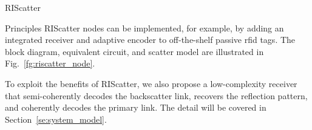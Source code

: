 \documentclass[journal]{IEEEtran}
\begin{document}
\begin{section}{RIScatter}
\begin{subsection}{Principles}
		RIScatter nodes can be implemented, for example, by adding an integrated receiver \cite{Kim2021a} and adaptive encoder \cite{He2020e} to off-the-shelf passive \gls{rfid} tags.
		The block diagram, equivalent circuit, and scatter model are illustrated in Fig.~\ref{fg:riscatter_node}.
		\begin{figure*}[!t]
			\centering
			\caption{
			Block diagram, equivalent circuit, and scatter model of a RIScatter node.
			The solid and dashed vectors represent signal and energy flows.
			The scatter antenna behaves as a constant power source, where the voltage $V_0$ and current $I_0$ are introduced by incident electric field $\vec{E}_{\text{I}}$ and magnetic field $\vec{H}_{\text{I}}$ \cite{Huang2021}.
			}
			\label{fg:riscatter_node}
		\end{figure*}
		To exploit the benefits of RIScatter, we also propose a low-complexity receiver that semi-coherently decodes the backscatter link, recovers the reflection pattern, and coherently decodes the primary link.
		The detail will be covered in Section~\ref{se:system_model}.
	\end{subsection}


\end{section}
\end{document}
